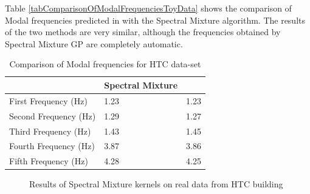 Table \ref{tabComparisonOfModalFrequenciesToyData} shows the comparison of Modal frequencies predicted in \cite{brincker2000modal} with the Spectral Mixture algorithm. The results of the two methods are very similar, although the frequencies obtained by Spectral Mixture GP are completely automatic. 

\renewcommand{\arraystretch}{1}
\begin{table}[!ht]
    \centering
\begin{tabular}{|l|l|l|}
  \hline
    & Spectral Mixture & \cite{brincker2000modal} \\
  \hline 
  \hline
First Frequency (Hz) & 1.23 & 1.23\\
Second Frequency (Hz)  & 1.29 & 1.27\\
Third Frequency (Hz) & 1.43 & 1.45\\
Fourth Frequency (Hz) & 3.87 & 3.86\\
Fifth Frequency (Hz) & 4.28 & 4.25\\
   \hline
\end{tabular}
\caption{Comparison of Modal frequencies for HTC data-set}
  \label{tabComparisonOfModalFrequenciesHTCData}
\end{table}

\begin{figure}[!ht]
  \centering
  \quad
    \quad
  
  \caption{Results of Spectral Mixture kernels on real data from HTC building}
\end{figure}

